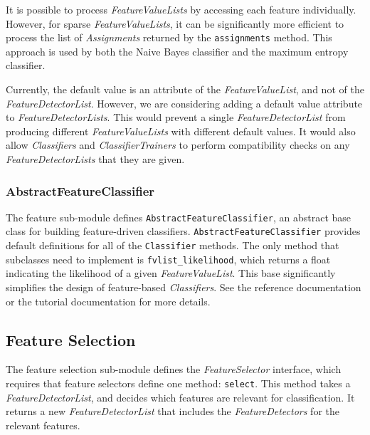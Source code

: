 \documentclass[12pt]{article}
\begin{document}
      It is possible to process \textit{FeatureValueLists} by
      accessing each feature individually.  However, for sparse
      \textit{FeatureValueLists}, it can be significantly more
      efficient to process the list of \textit{Assignments} returned
      by the \texttt{assignments} method.  This approach is used by
      both the Naive Bayes classifier and the maximum entropy
      classifier.

      Currently, the default value is an attribute of the
      \textit{FeatureValueList}, and not of the
      \textit{FeatureDetectorList}.  However, we are considering
      adding a default value attribute to
      \textit{FeatureDetectorLists}.  This would prevent a single
      \textit{FeatureDetectorList} from producing different
      \textit{FeatureValueLists} with different default values.  It
      would also allow \textit{Classifiers} and
      \textit{ClassifierTrainers} to perform compatibility checks on
      any \textit{FeatureDetectorLists} that they are given.

    \subsubsection{AbstractFeatureClassifier}

      The feature sub-module defines
      \texttt{AbstractFeatureClassifier}, an abstract base class for
      building feature-driven classifiers.
      \texttt{AbstractFeatureClassifier} provides default definitions
      for all of the \texttt{Classifier} methods.  The only method
      that subclasses need to implement is \texttt{fvlist\_likelihood},
      which returns a float indicating the likelihood of a given
      \textit{FeatureValueList}.  This base significantly simplifies
      the design of feature-based \textit{Classifiers}.  See the
      reference documentation or the tutorial documentation for more
      details.

  \subsection{Feature Selection}

    The feature selection sub-module defines the
    \textit{FeatureSelector} interface, which requires that feature
    selectors define one method: \texttt{select}.  This method takes a
    \textit{FeatureDetectorList}, and decides which features are
    relevant for classification. It returns a new
    \textit{FeatureDetectorList} that includes the
    \textit{FeatureDetectors} for the relevant features.
\end{document}
